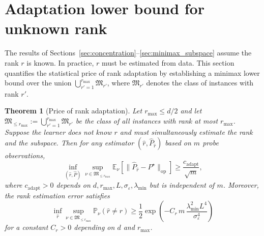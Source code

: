 \documentclass[12pt]{article}
\newcommand{\E}{\mathbb{E}}
\newcommand{\Prob}{\mathbb{P}}
\newcommand{\op}{\mathrm{op}}
\newtheorem{theorem}{Theorem}
\theoremstyle{plain}
\theoremstyle{definition}
\begin{document}
\section{Adaptation lower bound for unknown rank}
\label{sec:rank_adaptation}

The results of Sections~\ref{sec:concentration}--\ref{sec:minimax_subspace} assume the rank $r$ is known. In practice, $r$ must be estimated from data. This section quantifies the statistical price of rank adaptation by establishing a minimax lower bound over the union $\bigcup_{r'=1}^{r_{\max}} \mathfrak{M}_{r'}$, where $\mathfrak{M}_{r'}$ denotes the class of instances with rank $r'$.

\begin{theorem}[Price of rank adaptation]
\label{thm:rank_adaptation}
Let $r_{\max} \le d/2$ and let $\mathfrak{M}_{\le r_{\max}} := \bigcup_{r'=1}^{r_{\max}} \mathfrak{M}_{r'}$ be the class of all instances with rank at most $r_{\max}$. Suppose the learner does not know $r$ and must simultaneously estimate the rank and the subspace. Then for any estimator $(\hat{r}, \widehat{P}_{\hat{r}})$ based on $m$ probe observations,
\[
\inf_{(\hat{r}, \widehat{P})} \sup_{\nu \in \mathfrak{M}_{\le r_{\max}}}
\E_\nu\!\left[\|\widehat{P}_{\hat{r}} - P^\star\|_{\op}\right]
\ge \frac{c_{\mathrm{adapt}}}{\sqrt{m}},
\]
where $c_{\mathrm{adapt}} > 0$ depends on $d, r_{\max}, L, \sigma_\varepsilon, \lambda_{\min}$ but is independent of $m$. Moreover, the rank estimation error satisfies
\[
\inf_{\hat{r}} \sup_{\nu \in \mathfrak{M}_{\le r_{\max}}} \Prob_\nu(\hat{r} \neq r)
\ge \frac{1}{2} \exp\!\left(-C_r\, m\, \frac{\lambda_{\min}^2 L^4}{\sigma_\varepsilon^4}\right)
\]
for a constant $C_r > 0$ depending on $d$ and $r_{\max}$.
\end{theorem}
\end{document}
